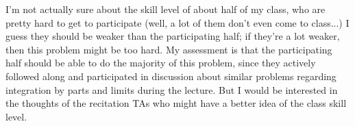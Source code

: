 \documentclass[10pt]{article}
\theoremstyle{definition}
\begin{document}
I'm not actually sure about the skill level of about half of my class, who are pretty hard to get to participate (well, a lot of them don't even come to class...)
I guess they should be weaker than the participating half; if they're a lot weaker, then this problem might be too hard.
My assessment is that the participating half should be able to do the majority of this problem, since they actively followed along and participated in discussion about similar problems regarding integration by parts and limits during the lecture.
But I would be interested in the thoughts of the recitation TAs who might have a better idea of the class skill level.
\end{document}
